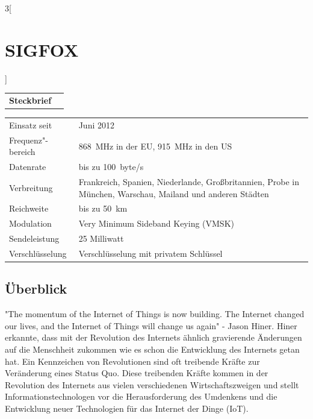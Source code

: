 \begin{multicols}{3}[\section{SIGFOX}]


\newrefsegment

\begin{tabular}{p{}p{2.7 cm}}
\textbf{Steckbrief}& \\
\end{tabular}
\begin{tabular}{p{}p{2.7 cm}}
      Einsatz seit & Juni 2012\\
      Frequenz"-bereich  & \SI{868}{\mega\hertz} in der EU, \SI{915}{\mega\hertz} in den US\\
      Datenrate & bis zu \SI{100}{byte/s}\\
      Verbreitung & Frankreich, Spanien, Niederlande, Großbritannien, Probe in München, Warschau, Mailand und anderen Städten\\
      Reichweite & bis zu \SI{50}{\kilo\metre}\\
      Modulation & Very Minimum Sideband Keying (VMSK)\\
      Sendeleistung & 25 Milliwatt\\
      Verschlüsselung & Verschlüsselung mit privatem Schlüssel\\
\end{tabular}
\par
\subsection*{Überblick}

"The momentum of the Internet of Things is now building. The Internet changed our lives, and the Internet of Things will change us again" - Jason Hiner. Hiner erkannte, dass mit der Revolution des Internets ähnlich gravierende Änderungen auf die Menschheit zukommen wie es schon die Entwicklung des Internets getan hat. Ein Kennzeichen von Revolutionen sind oft treibende Kräfte zur Veränderung eines Status Quo. Diese treibenden Kräfte kommen in der Revolution des Internets aus vielen verschiedenen Wirtschaftszweigen und stellt Informationstechnologen vor die Herausforderung des Umdenkens und die Entwicklung neuer Technologien für das Internet der Dinge (IoT).~\cite{sigfox.1}


\end{multicols}
